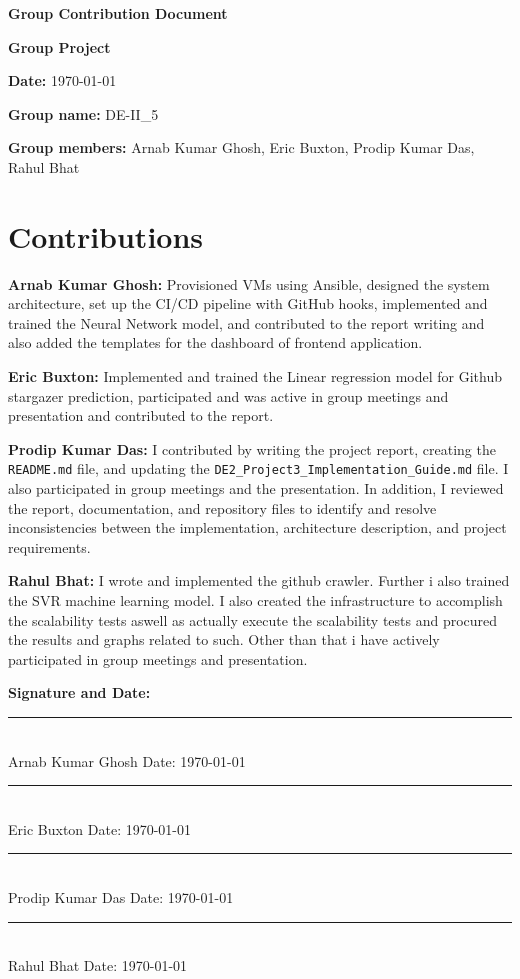 \documentclass[12pt,a4paper]{article}
\begin{document}
\begin{center}
    {\Large\bfseries Group Contribution Document}
\end{center}

\bigskip

\textbf{Group Project}

\textbf{Date:} \today

\textbf{Group name:} DE-II\_5

\textbf{Group members:} Arnab Kumar Ghosh, Eric Buxton, Prodip Kumar Das, Rahul Bhat

\bigskip
\section*{Contributions}

\textbf{Arnab Kumar Ghosh:} Provisioned VMs using Ansible, designed the system architecture, set up the CI/CD pipeline with GitHub hooks, implemented and trained the Neural Network model, and contributed to the report writing and also added the templates for the dashboard of frontend application.

\textbf{Eric Buxton:}  Implemented and trained the Linear regression model for Github stargazer prediction, participated and was active in group meetings and presentation and contributed to the report.

\textbf{Prodip Kumar Das:} I contributed by writing the project report, creating the \texttt{README.md} file, and updating the \texttt{DE2\_Project3\_Implementation\_Guide.md} file. I also participated in group meetings and the presentation. In addition, I reviewed the report, documentation, and repository files to identify and resolve inconsistencies between the implementation, architecture description, and project requirements.

\textbf{Rahul Bhat:} I wrote and implemented the github crawler. Further i also trained the SVR machine learning model. I also created the infrastructure to accomplish the scalability tests aswell as actually execute the scalability tests and procured the results and graphs related to such. Other than that i have actively participated in group meetings and presentation. 

\bigskip\bigskip

\textbf{Signature and Date:}

\bigskip

\noindent\rule{\linewidth}{0.4pt}\\
Arnab Kumar Ghosh \hfill Date: \today

\bigskip

\noindent\rule{\linewidth}{0.4pt}\\
Eric Buxton \hfill Date: \today

\bigskip

\noindent\rule{\linewidth}{0.4pt}\\
Prodip Kumar Das \hfill Date: \today

\bigskip

\noindent\rule{\linewidth}{0.4pt}\\
Rahul Bhat \hfill Date: \today
\end{document}
